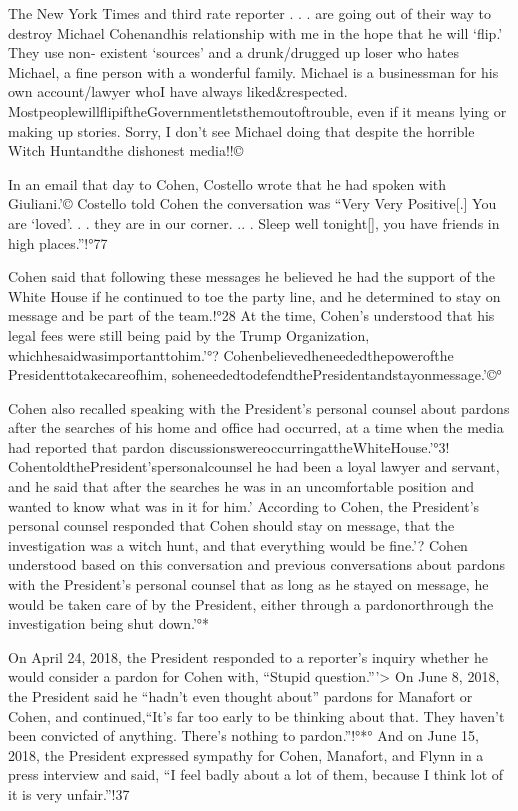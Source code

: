 The New York Times and third rate reporter . . . are going out of their way to destroy Michael Cohenandhis relationship with me in the hope that he will ‘flip.' They use non- existent ‘sources' and a drunk/drugged up loser who hates Michael, a fine person with a wonderful family. Michael is a businessman for his own account/lawyer whoI have always liked&respected. MostpeoplewillflipiftheGovernmentletsthemoutoftrouble, even if it means lying or making up stories. Sorry, I don't see Michael doing that despite the horrible Witch Huntandthe dishonest media!!©%

In an email that day to Cohen, Costello wrote that he had spoken with Giuliani.'© Costello told Cohen the conversation was “Very Very Positive[.] You are ‘loved'. . . they are in our corner. .. . Sleep well tonight[], you have friends in high places.”!°77

Cohen said that following these messages he believed he had the support of the White House if he continued to toe the party line, and he determined to stay on message and be part of the team.!°28 At the time, Cohen's understood that his legal fees were still being paid by the Trump Organization, whichhesaidwasimportanttohim.'°? Cohenbelievedheneededthepowerofthe Presidenttotakecareofhim, soheneededtodefendthePresidentandstayonmessage.'©°

Cohen also recalled speaking with the President's personal counsel about pardons after the searches of his home and office had occurred, at a time when the media had reported that pardon discussionswereoccurringattheWhiteHouse.'°3! CohentoldthePresident'spersonalcounsel he had been a loyal lawyer and servant, and he said that after the searches he was in an uncomfortable position and wanted to know what was in it for him.'%
According to Cohen, the President's personal counsel responded that Cohen should stay on message, that the investigation was a witch hunt, and that everything would be fine.'? Cohen understood based on this conversation and previous conversations about pardons with the President's personal counsel that as long as he stayed on message, he would be taken care of by the President, either through a pardonorthrough the investigation being shut down.'°*

On April 24, 2018, the President responded to a reporter's inquiry whether he would consider a pardon for Cohen with, “Stupid question.”'> On June 8, 2018, the President said he “hadn't even thought about” pardons for Manafort or Cohen, and continued,“It's far too early to be thinking about that. They haven't been convicted of anything. There's nothing to pardon.”!°*° And on June 15, 2018, the President expressed sympathy for Cohen, Manafort, and Flynn in a press interview and said, “I feel badly about a lot of them, because I think lot of it is very unfair.”!37

